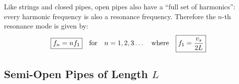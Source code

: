 Like strings and closed pipes, open pipes also have a
``full set of harmonics'': every harmonic frequency is also a resonance
frequency. Therefore the $n$-th resonance mode is given by:
\begin{equation}
  \boxed{f_n=nf_1}
  \quad\text{for}\quad n=1,2,3\ldots
  \quad\text{\normalsize where}
  \quad\boxed{f_1=\frac{v_s}{2L}}
\end{equation}
%
%
%
%



\subsection{Semi-Open Pipes of Length $L$}

